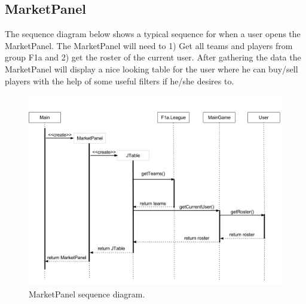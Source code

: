 \documentclass{article}
\begin{document}
\subsection{MarketPanel}
The sequence diagram below shows a typical sequence for when a user opens the MarketPanel. The MarketPanel will need to 1) Get all teams and players from group F1a and 2) get the roster of the current user. After gathering the data the MarketPanel will display a nice looking table for the user where he can buy/sell players with the help of some useful filters if he/she desires to.
\begin{figure}[H]
\centering
\includegraphics[width=\textwidth]{img/seq_diagram_1.png}
\caption{MarketPanel sequence diagram.}
\end{figure}

\newpage
\end{document}
